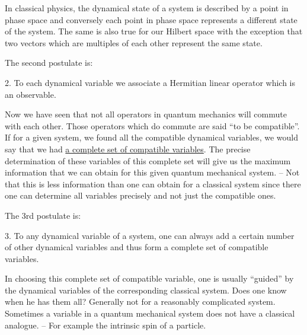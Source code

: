 In classical physics, the dynamical state of a system is described by a point in phase space and conversely each point in phase space represents a different state of the system. The same is also true for our Hilbert space with 
the exception that two vectors which are multiples of each other represent the same state. 

The second postulate is: 
\begin{postulate} 2. To each dynamical variable we associate a Hermitian linear operator which is an observable.
\end{postulate}
Now we have seen that not all operators in quantum mechanics will commute with each other. Those operators which do commute are said ``to be compatible''. If for a given system, we found all the compatible
dynamical variables, we would say that we had \underline{a complete set of compatible variables}. The precise determination of these variables of this complete set will give us the maximum information that we can obtain for 
this given quantum mechanical system. -- Not that this is less information than one can obtain for a classical system since there one can determine all variables precisely and not just the compatible ones. 

The 3rd postulate is: 
\begin{postulate}3. To any dynamical variable of a system, one can always add a certain number of other dynamical variables and thus form a complete set of compatible variables.
\end{postulate}
In choosing this complete set of compatible variable, one is usually ``guided'' by the dynamical variables of the corresponding classical system. Does one know when he has them all? Generally not for a reasonably complicated 
system. Sometimes a variable in a quantum mechanical system does not have a classical analogue. -- For example the intrinsic spin of a particle.